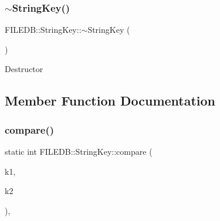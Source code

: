 \subsubsection{\texorpdfstring{$\sim$StringKey()}{~StringKey()}\hspace{0.1cm}{\footnotesize\ttfamily [2/2]}}
{\footnotesize\ttfamily F\+I\+L\+E\+D\+B\+::\+String\+Key\+::$\sim$\+String\+Key (\begin{DoxyParamCaption}\item[{void}]{ }\end{DoxyParamCaption})}

Destructor 

\subsection{Member Function Documentation}
\mbox{\label{classFILEDB_1_1StringKey_a22a3b33f93050dffa239cfc106044935}} 
\subsubsection{\texorpdfstring{compare()}{compare()}\hspace{0.1cm}{\footnotesize\ttfamily [1/2]}}
{\footnotesize\ttfamily static int F\+I\+L\+E\+D\+B\+::\+String\+Key\+::compare (\begin{DoxyParamCaption}\item[{const \mbox{\hyperlink{other__libs_2filedb_2filehash_2ffdb__db_8h_aa2e0984399491df0fdd20898ca8758f9}{F\+F\+D\+B\+\_\+\+D\+BT}} $\ast$}]{k1,  }\item[{const \mbox{\hyperlink{other__libs_2filedb_2filehash_2ffdb__db_8h_aa2e0984399491df0fdd20898ca8758f9}{F\+F\+D\+B\+\_\+\+D\+BT}} $\ast$}]{k2 }\end{DoxyParamCaption})\hspace{0.3cm}{\ttfamily [inline]}, {\ttfamily [static]}}

\mbox{\label{classFILEDB_1_1StringKey_a22a3b33f93050dffa239cfc106044935}} 

